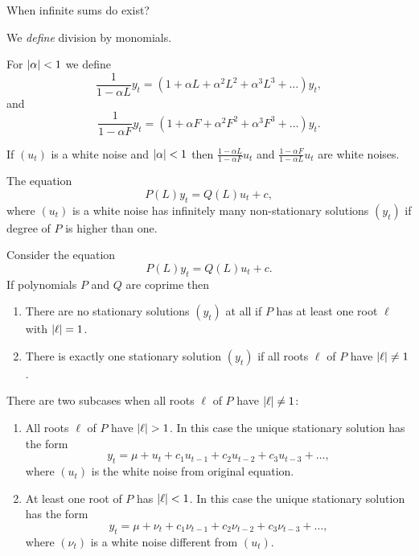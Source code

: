 \documentclass[12pt]{article} %
\begin{document}
When infinite sums do exist?





We \textit{define} division by monomials.



\begin{definition}
    For $\abs{\alpha} < 1$ we define
    \[
    \frac{1}{1 - \alpha L} y_t = (1 + \alpha L + \alpha^2 L^2 +\alpha^3 L^3 + \ldots )y_t,    
    \]
    and 
    \[
    \frac{1}{1 - \alpha F} y_t = (1 + \alpha F + \alpha^2 F^2 +\alpha^3 F^3 + \ldots )y_t.    
    \]
\end{definition}


\begin{theorem}
    If $(u_t)$ is a white noise and $\abs{\alpha} < 1$ then 
    $\frac{1- \alpha L}{1 - \alpha F} u_t$ and $\frac{1- \alpha F}{1 - \alpha L} u_t$ are white noises. 
\end{theorem}



\begin{theorem}
    The equation 
    \[
    P(L) y_t = Q(L)u_t + c,    
    \]
    where $(u_t)$ is a white noise 
    has infinitely many non-stationary solutions $(y_t)$ if degree of $P$ is higher than one. 
\end{theorem}

\begin{theorem}
Consider the equation 
\[
    P(L) y_t = Q(L)u_t + c.
\]
If polynomials $P$ and $Q$ are coprime then 
\begin{enumerate}
    \item There are no stationary solutions $(y_t)$ at all if $P$ has at least one root $\ell$ with $\abs{\ell} = 1$.
    \item There is exactly one stationary solution $(y_t)$ if all roots $\ell$ of $P$ have $\abs{\ell} \neq 1$.
\end{enumerate}

There are two subcases when all roots $\ell$ of $P$ have $\abs{\ell} \neq 1$:
\begin{enumerate}
    \item All roots $\ell$ of $P$ have $\abs{\ell} > 1$.
    In this case the unique stationary solution has the form 
    \[
        y_t = \mu + u_t + c_1 u_{t-1} + c_2 u_{t-2} + c_3 u_{t-3} + \ldots,
    \]
    where $(u_t)$ is the white noise from original equation. 
    \item At least one root of $P$ has $\abs{\ell} <1$.
    In this case the unique stationary solution has the form 
    \[
        y_t = \mu + \nu_t + c_1 \nu_{t-1} + c_2 \nu_{t-2} + c_3 \nu_{t-3} + \ldots,
    \]
    where $(\nu_t)$ is a white noise different from $(u_t)$.

\end{enumerate}

\end{theorem}
\end{document}
